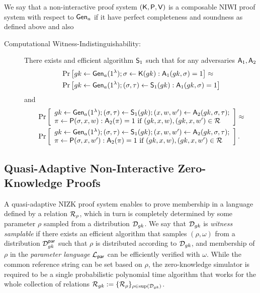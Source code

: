 \begin{definition} We say that a non-interactive proof system $(\mathsf{K},\mathsf{P},\mathsf{V})$ is a composable NIWI proof system with respect to $\mathsf{Gen}_a$ if it have perfect completeness and soundness as defined above and also
\begin{description}
\item[Computational Witness-Indistinguishability:] There exists and efficient algorithm $\mathsf{S}_1$ such that for any adversaries $\mathsf{A}_1,\mathsf{A}_2$
\begin{align*}
&\Pr\left[
gk\gets\mathsf{Gen}_a(1^\lambda);\sigma\gets\mathsf{K}(gk):
\mathsf{A}_1(gk,\sigma)=1
\right]\approx\\
&\Pr\left[
gk\gets\mathsf{Gen}_a(1^\lambda);(\sigma,\tau)\gets\mathsf{S}_1(gk):
\mathsf{A}_1(gk,\sigma)=1
\right]
\end{align*}
and
\begin{align*}
&\Pr\left[
\begin{array}{l}
gk\gets\mathsf{Gen}_a(1^\lambda);(\sigma,\tau)\gets\mathsf{S}_1(gk);(x,w,w')\gets\mathsf{A}_2(gk,\sigma,\tau);\\
\pi\gets\mathsf{P}(\sigma,x,w):\mathsf{A}_2(\pi)=1\text{ if }(gk,x,w),(gk,x,w')\in\mathcal{R}
\end{array}
\right]\approx\\
&\Pr\left[
\begin{array}{l}
gk\gets\mathsf{Gen}_a(1^\lambda);(\sigma,\tau)\gets\mathsf{S}_1(gk);(x,w,w')\gets\mathsf{A}_2(gk,\sigma,\tau);\\
\pi\gets\mathsf{P}(\sigma,x,w'):\mathsf{A}_2(\pi)=1\text{ if }(gk,x,w),(gk,x,w')\in\mathcal{R}
\end{array}
\right].
\end{align*}
\end{description}
\end{definition}

\subsection{Quasi-Adaptive Non-Interactive Zero-Knowledge Proofs}
A quasi-adaptive NIZK proof system \cite{AC:JutRoy13} enables
to prove membership in a language defined by a relation $\mathcal{R}_\rho$, which in turn is completely determined by some parameter
$\rho$ sampled from a distribution $\mathcal{D}_{gk}$.
We say that $\mathcal{D}_{gk}$ is \emph{witness samplable} if there exists an efficient
algorithm that samples $(\rho,\omega)$ from a distribution $\mathcal{D}_{gk}^{\mathsf{par}}$ such that $\rho$ is distributed according to $\mathcal{D}_{gk}$, and membership of $\rho$
in the \emph{parameter language} $\mathcal{L}_\mathsf{par}$ can be efficiently verified with $\omega$.
While the common reference string can be set based on $\rho$, the zero-knowledge simulator is required to be a single probabilistic polynomial time
algorithm that works for the whole collection of relations $\mathcal{R}_{gk}:=\{\mathcal{R}_\rho\}_{\rho \in \mathrm{sup}(\mathcal{D}_{gk})}$. 

